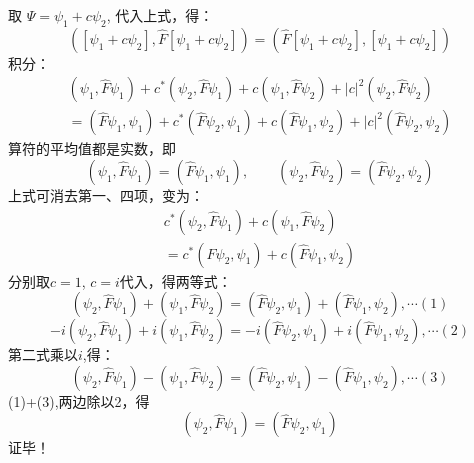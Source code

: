 \begin{frame} [allowframebreaks=]
        取 $\Psi= \psi_1+c\psi_2 $, 代入上式，得：
        $$([\psi_1+c\psi_2],\hat{F} [\psi_1+c\psi_2])=(\hat{F}[\psi_1+c\psi_2],[\psi_1+c\psi_2]) $$
        积分：
        $$
        \begin{array}{r}
        \left(\psi_{1}, \hat{F} \psi_{1}\right)+c^{*}\left(\psi_{2}, \hat{F} \psi_{1}\right)+c\left(\psi_{1}, \hat{F} \psi_{2}\right)+|c|^{2}\left(\psi_{2}, \hat{F} \psi_{2}\right) \\
        =\left(\hat{F} \psi_{1}, \psi_{1}\right)+c^{*}\left(\hat{F} \psi_{2}, \psi_{1}\right)+c\left(\hat{F} \psi_{1}, \psi_{2}\right)+|c|^{2}\left(\hat{F} \psi_{2}, \psi_{2}\right)
        \end{array}
        $$
        算符的平均值都是实数，即 
        $$(\psi_1,\hat{F}\psi_1)=(\hat{F} \psi_1, \psi_1), \qquad (\psi_2,\hat{F}\psi_2)=(\hat{F} \psi_2, \psi_2) $$
        上式可消去第一、四项，变为：
        $$\begin{array}{r}
            c^{*}\left(\psi_{2}, \hat{F} \psi_{1}\right)+c\left(\psi_{1}, \hat{F} \psi_{2}\right) \\
            =c^{*}\left(\hat{F} \psi_{2}, \psi_{1}\right)+c\left(\hat{F} \psi_{1}, \psi_{2}\right)
        \end{array}$$
        分别取$c=1$, $c=i$代入，得两等式：
        $$  \left(\psi_{2}, \hat{F} \psi_{1}\right)+\left(\psi_{1}, \hat{F} \psi_{2}\right) = 
        \left(\hat{F} \psi_{2}, \psi_{1}\right)+\left(\hat{F} \psi_{1}, \psi_{2}\right) , \cdots (1)
        $$
        $$
        -i\left(\psi_{2}, \hat{F} \psi_{1}\right)+i\left(\psi_{1}, \hat{F} \psi_{2}\right) 
        =-i\left(\hat{F} \psi_{2}, \psi_{1}\right)+i\left(\hat{F} \psi_{1}, \psi_{2}\right),\cdots (2)
        $$
        第二式乘以$i$,得：
        $$
        \left(\psi_{2}, \hat{F} \psi_{1}\right)-\left(\psi_{1}, \hat{F} \psi_{2}\right) 
        =\left(\hat{F} \psi_{2}, \psi_{1}\right)-\left(\hat{F} \psi_{1}, \psi_{2}\right), \cdots (3)
        $$
        (1)+(3),两边除以2，得
        $$
        \left(\psi_{2}, \hat{F} \psi_{1}\right) =\left(\hat{F} \psi_{2}, \psi_{1}\right)
        $$
        证毕！
\end{frame} 

